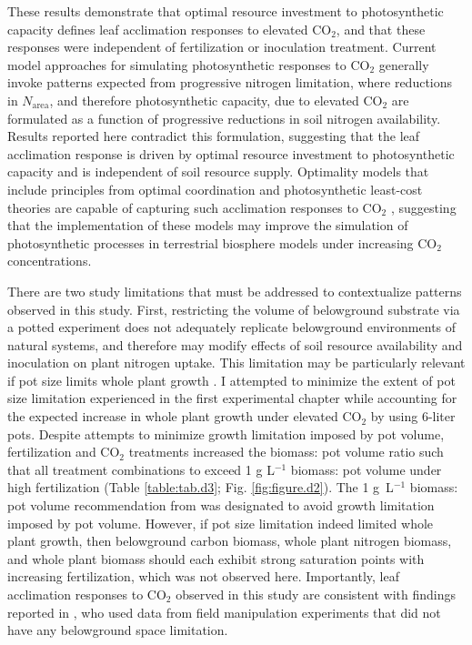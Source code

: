 These results demonstrate that optimal resource investment to photosynthetic capacity defines leaf acclimation responses to elevated CO$_2$, and that these responses were independent of fertilization or inoculation treatment. Current model approaches for simulating photosynthetic responses to CO$_2$ generally invoke patterns expected from progressive nitrogen limitation, where reductions in $N_\mathrm{area}$, and therefore photosynthetic capacity, due to elevated CO$_2$ are formulated as a function of progressive reductions in soil nitrogen availability. Results reported here contradict this formulation, suggesting that the leaf acclimation response is driven by optimal resource investment to photosynthetic capacity and is independent of soil resource supply. Optimality models that include principles from optimal coordination and photosynthetic least-cost theories  are capable of capturing such acclimation responses to CO$_2$ , suggesting that the implementation of these models may improve the simulation of photosynthetic processes in terrestrial biosphere models under increasing CO$_2$ concentrations.

There are two study limitations that must be addressed to contextualize patterns observed in this study. First, restricting the volume of belowground substrate via a potted experiment does not adequately replicate belowground environments of natural systems, and therefore may modify effects of soil resource availability and inoculation on plant nitrogen uptake. This limitation may be particularly relevant if pot size limits whole plant growth . I attempted to minimize the extent of pot size limitation experienced in the first experimental chapter while accounting for the expected increase in whole plant growth under elevated CO$_2$ by using 6-liter pots. Despite attempts to minimize growth limitation imposed by pot volume, fertilization and CO$_2$ treatments increased the biomass: pot volume ratio such that all treatment combinations to exceed 1 g L$^{-1}$ biomass: pot volume under high fertilization (Table \ref{table:tab.d3}; Fig. \ref{fig:figure.d2}). The 1 g\ L$^{-1}$ biomass: pot volume recommendation from  was designated to avoid growth limitation imposed by pot volume. However, if pot size limitation indeed limited whole plant growth, then belowground carbon biomass, whole plant nitrogen biomass, and whole plant biomass should each exhibit strong saturation points with increasing fertilization, which was not observed here.  Importantly, leaf acclimation responses to CO$_2$ observed in this study are consistent with findings reported in , who used data from field manipulation experiments that did not have any belowground space limitation.

